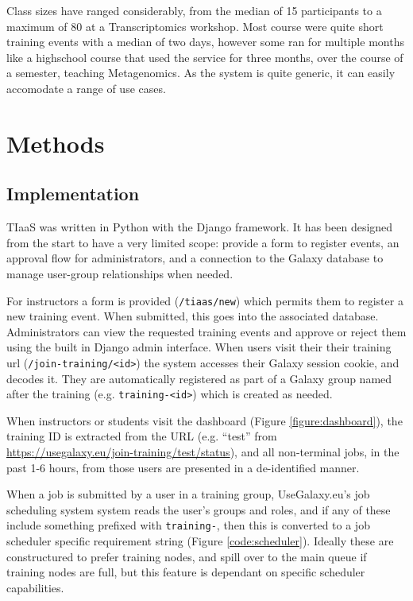 \documentclass[a4paper,num-refs]{oup-contemporary}
\begin{document}
Class sizes have ranged considerably, from the median of 15 participants to a maximum of 80 at a Transcriptomics workshop. Most course were quite short training events with a median of two days, however some ran for multiple months like a highschool course that used the service for three months, over the course of a semester, teaching Metagenomics. As the system is quite generic, it can easily accomodate a range of use cases.

\section{Methods}

\subsection{Implementation}
TIaaS was written in Python with the Django framework. It has been designed from the start to have a very limited scope: provide a form to register events, an approval flow for administrators, and a connection to the Galaxy database to manage user-group relationships when needed.

For instructors a form is provided (\texttt{/tiaas/new}) which permits them to register a new training event. When submitted, this goes into the associated database. Administrators can view the requested training events and approve or reject them using the built in Django admin interface. When users visit their their training url (\texttt{/join-training/<id>}) the system accesses their Galaxy session cookie, and decodes it. They are automatically registered as part of a Galaxy group named after the training (e.g. \texttt{training-<id>}) which is created as needed.

When instructors or students visit the dashboard (Figure \ref{figure:dashboard}), the training ID is extracted from the URL (e.g. ``test'' from \url{https://usegalaxy.eu/join-training/test/status}), and all non-terminal jobs, in the past 1-6 hours, from those users are presented in a de-identified manner.

When a job is submitted by a user in a training group, UseGalaxy.eu's job scheduling system system reads the user's groups and roles, and if any of these include something prefixed with \texttt{training-}, then this is converted to a job scheduler specific requirement string (Figure \ref{code:scheduler}). Ideally these are constructured to prefer training nodes, and spill over to the main queue if training nodes are full, but this feature is dependant on specific scheduler capabilities.
\end{document}

